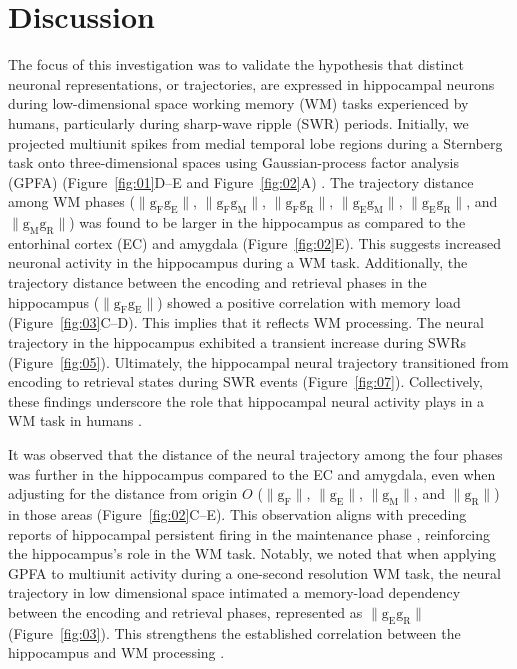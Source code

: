 \section{Discussion}
The focus of this investigation was to validate the hypothesis that distinct neuronal representations, or trajectories, are expressed in hippocampal neurons during low-dimensional space working memory (WM) tasks experienced by humans, particularly during sharp-wave ripple (SWR) periods. Initially, we projected multiunit spikes from medial temporal lobe regions during a Sternberg task onto three-dimensional spaces using Gaussian-process factor analysis (GPFA) (Figure~\ref{fig:01}D--E and Figure~\ref{fig:02}A) \cite{yu_gaussian-process_2009}. The trajectory distance among WM phases ($\mathrm{\lVert g_{F}g_{E} \rVert}$, $\mathrm{\lVert g_{F}g_{M} \rVert}$, $\mathrm{\lVert g_{F}g_{R} \rVert}$, $\mathrm{\lVert g_{E}g_{M} \rVert}$, $\mathrm{\lVert g_{E}g_{R} \rVert}$, and $\mathrm{\lVert g_{M}g_{R} \rVert}$) was found to be larger in the hippocampus as compared to the entorhinal cortex (EC) and amygdala (Figure~\ref{fig:02}E). This suggests increased neuronal activity in the hippocampus during a WM task. Additionally, the trajectory distance between the encoding and retrieval phases in the hippocampus ($\mathrm{\lVert g_{F}g_{E} \rVert}$) showed a positive correlation with memory load (Figure~\ref{fig:03}C--D). This implies that it reflects WM processing. The neural trajectory in the hippocampus exhibited a transient increase during SWRs (Figure~\ref{fig:05}). Ultimately, the hippocampal neural trajectory transitioned from encoding to retrieval states during SWR events (Figure~\ref{fig:07}). Collectively, these findings underscore the role that hippocampal neural activity plays in a WM task in humans \cite{naber_reciprocal_2001,van_strien_anatomy_2009,strange_functional_2014}.

It was observed that the distance of the neural trajectory among the four phases was further in the hippocampus compared to the EC and amygdala, even when adjusting for the distance from origin $O$ ($\mathrm{\lVert g_{F} \rVert}$, $\mathrm{\lVert g_{E} \rVert}$, $\mathrm{\lVert g_{M} \rVert}$, and $\mathrm{\lVert g_{R} \rVert}$) in those areas (Figure~\ref{fig:02}C--E). This observation aligns with preceding reports of hippocampal persistent firing in the maintenance phase \cite{boran_persistent_2019,kaminski_persistently_2017,kornblith_persistent_2017,faraut_dataset_2018}, reinforcing the hippocampus's role in the WM task. Notably, we noted that when applying GPFA to multiunit activity during a one-second resolution WM task, the neural trajectory in low dimensional space intimated a memory-load dependency between the encoding and retrieval phases, represented as $\mathrm{\lVert g_{E}g_{R} \rVert}$ (Figure~\ref{fig:03}). This strengthens the established correlation between the hippocampus and WM processing \cite{oso_boran_2020}.

